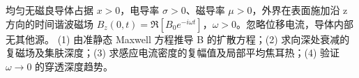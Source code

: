 均匀无磁良导体占据 \(x>0\)，电导率 \(\sigma>0\)、磁导率 \(\mu>0\)，外界在表面施加沿 z 方向的时间谐波磁场 \(B_z(0,t)=\Re[B_0e^{-i\omega t}]\)，\(\omega>0\)。忽略位移电流，导体内部无其他源。
(1) 由准静态 Maxwell 方程推导 B 的扩散方程；(2) 求向深处衰减的复磁场及集肤深度；(3) 求感应电流密度的复幅值及局部平均焦耳热；(4) 验证 \(\omega\to0\) 的穿透深度趋势。
